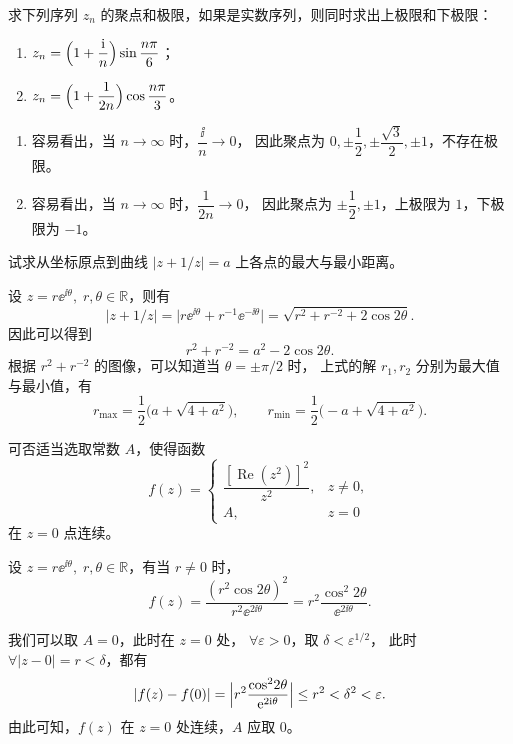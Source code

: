 \begin{question}
求下列序列 \(z_n\) 的聚点和极限，如果是实数序列，则同时求出上极限和下极限：
\begin{enumerate}
  \item \(\displaystyle z_n=\Bigl(1+\frac{\mathrm{i}}{n}\Bigr)\sin\frac{n\pi}{6}\)；
  \item \(\displaystyle z_n=\Bigl(1+\frac{1}{2n}\Bigr)\cos\frac{n\pi}{3}\)。
\end{enumerate}
\begin{solution}
\begin{enumerate}
  \item 容易看出，当 \(n\to\infty\) 时，\(\dfrac{\ii}{n}\to0\)，
  因此聚点为 \(0,\pm\dfrac12,\pm\dfrac{\sqrt3}{2},\pm1\)，不存在极限。
  \item 容易看出，当 \(n\to\infty\) 时，\(\dfrac{1}{2n}\to0\)，
  因此聚点为 \(\pm\dfrac12,\pm1\)，上极限为 \(1\)，下极限为 \(-1\)。
\end{enumerate}
\end{solution}
\end{question}


\begin{question}
试求从坐标原点到曲线 \(|z+1/z|=a\) 上各点的最大与最小距离。
\begin{solution}
设 \(z=r\ee^{\ii\theta},\;r,\theta\in\mathbb{R}\)，则有
\[
\bigl|z+1/z\bigr|
=\bigl|r\ee^{\ii\theta}+r^{-1}\ee^{-\ii\theta}\bigr|
=\sqrt{r^2+r^{-2}+2\cos2\theta}.
\]
因此可以得到
\[
r^2+r^{-2}=a^2-2\cos2\theta.
\]
根据 \(r^2+r^{-2}\) 的图像，可以知道当 \(\theta=\pm\pi/2\) 时，
上式的解 \(r_1,r_2\) 分别为最大值与最小值，有
\[
r_{\max}=\frac12\bigl(a+\sqrt{4+a^2}\bigr),\qquad
r_{\min}=\frac12\bigl(-a+\sqrt{4+a^2}\bigr).
\]
\end{solution}
\end{question}


\begin{question}
可否适当选取常数 \(A\)，使得函数
\[
f(z)=\begin{cases}
\dfrac{[\operatorname{Re}(z^2)]^2}{z^2}, & z\neq0,\\[6pt]
A, & z=0
\end{cases}
\]
在 \(z=0\) 点连续。
\begin{solution}
设 \(z=r\ee^{\ii\theta},\;r,\theta\in\mathbb{R}\)，有当 \(r\neq0\) 时，
\[
f(z)=\frac{(r^2\cos2\theta)^2}{r^2\ee^{2\ii\theta}}
=r^2\frac{\cos^2\!2\theta}{\ee^{2\ii\theta}}.
\]

我们可以取 \(A=0\)，此时在 \(z=0\) 处，
\(\forall\varepsilon>0\)，取 \(\delta<\varepsilon^{1/2}\)，
此时 \(\forall|z-0|=r<\delta\)，都有
\[
|f(z)-f(0)|
=\Bigl|r^2\frac{\cos^2\!2\theta}{\mathrm{e}^{2\mathrm{i}\theta}}\Bigr|
\le r^2<\delta^2<\varepsilon.
\]
由此可知，\(f(z)\) 在 \(z=0\) 处连续，\(A\) 应取 \(0\)。
\end{solution}
\end{question}


